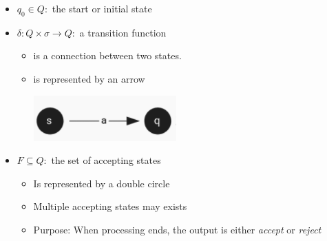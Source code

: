 \documentclass[12pt]{article}
\begin{document}
\begin{itemize}
\begin{itemize}
\begin{itemize}
            \item $q_0 \in Q:$ the start or initial state
            \item $\delta: Q \times \sigma \to Q:$ a transition function
            \begin{itemize}
                \item is a connection between two states.
                \item is represented by an arrow
                \begin{center}
                \includegraphics[width=0.4 \linewidth]{images/worksheet_8_notes_4.png}
                \end{center}
            \end{itemize}
            \item $F \subseteq Q:$ the set of accepting states
            \begin{itemize}
                \item Is represented by a double circle
                \item Multiple accepting states may exists
                \item Purpose: When processing ends, the output is either \textit{accept} or \textit{reject}
            \end{itemize}
        \end{itemize}
    \end{itemize}
\end{itemize}
\end{document}
